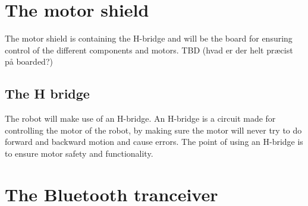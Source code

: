 \section{The motor shield}
The motor shield is containing the H-bridge and will be the board for ensuring control of the different components and motors.
TBD (hvad er der helt præcist på boarded?)

\subsection{The H bridge}
The robot will make use of an H-bridge. An H-bridge is a circuit made for controlling the motor of the robot, by making sure the motor will never try to do forward and backward motion  and cause errors. The point of using an H-bridge is to ensure motor safety and functionality.

\section{The Bluetooth tranceiver}

